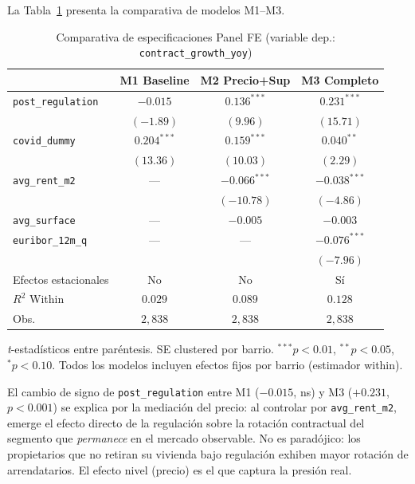 \documentclass[12pt,a4paper]{article}
\begin{document}
La Tabla~\ref{tab:panel} presenta la comparativa de modelos M1--M3.

\begin{table}[H]
\caption{Comparativa de especificaciones Panel FE (variable dep.: \texttt{contract\_growth\_yoy})}
\label{tab:panel}
\centering
\small
\begin{threeparttable}
\begin{tabular}{lccc}
\toprule
 & M1 Baseline & M2 Precio+Sup & M3 Completo \\
\midrule
\texttt{post\_regulation}
  & $-0.015$ & $0.136^{***}$ & $0.231^{***}$ \\
  & $(-1.89)$ & $(9.96)$ & $(15.71)$ \\
\texttt{covid\_dummy}
  & $0.204^{***}$ & $0.159^{***}$ & $0.040^{**}$ \\
  & $(13.36)$ & $(10.03)$ & $(2.29)$ \\
\texttt{avg\_rent\_m2}
  & --- & $-0.066^{***}$ & $-0.038^{***}$ \\
  & & $(-10.78)$ & $(-4.86)$ \\
\texttt{avg\_surface}
  & --- & $-0.005$ & $-0.003$ \\
\texttt{euribor\_12m\_q}
  & --- & --- & $-0.076^{***}$ \\
  & & & $(-7.96)$ \\
Efectos estacionales
  & No & No & Sí \\
\midrule
$R^2$ Within & $0.029$ & $0.089$ & $0.128$ \\
Obs.\ & $2{,}838$ & $2{,}838$ & $2{,}838$ \\
\bottomrule
\end{tabular}
\begin{tablenotes}
\small\item \textit{t}-estadísticos entre paréntesis. SE clustered por barrio.
$^{***}p<0.01$, $^{**}p<0.05$, $^{*}p<0.10$.
Todos los modelos incluyen efectos fijos por barrio (estimador within).
\end{tablenotes}
\end{threeparttable}
\end{table}

El cambio de signo de \texttt{post\_regulation} entre M1 ($-0.015$, ns) y M3
($+0.231$, $p<0.001$) se explica por la mediación del precio: al controlar por
\texttt{avg\_rent\_m2}, emerge el efecto directo de la regulación sobre la rotación
contractual del segmento que \textit{permanece} en el mercado observable. No es
paradójico: los propietarios que no retiran su vivienda bajo regulación exhiben mayor
rotación de arrendatarios. El efecto nivel (precio) es el que captura la presión real.
\end{document}
